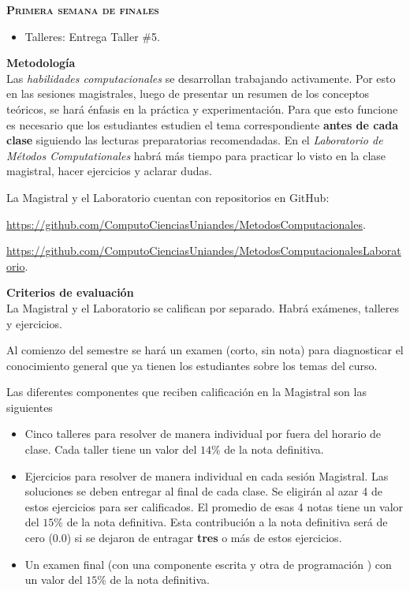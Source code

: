 \documentclass[letterpaper,10pt,onecolumn]{article}
\begin{document}
\noindent\textbf{\textsc{Primera semana de finales}}\\[-0.5cm]
\begin{itemize}
\item Talleres: Entrega Taller \#5. \\[-0.6cm]
\end{itemize}

\noindent\textbf{\large {} \quad
  Metodolog\'ia}\\[-0.2cm] 


\noindent\normalsize 
Las \emph{habilidades computacionales} se desarrollan trabajando activamente. 
Por esto en las sesiones magistrales, luego de presentar un resumen de
los conceptos te\'oricos, se har\'a \'enfasis en la pr\'actica y
experimentaci\'on.   
Para que esto funcione es necesario que los estudiantes estudien el
tema correspondiente {\bf antes de cada clase} siguiendo las lecturas
preparatorias recomendadas. En el \emph{Laboratorio de M\'etodos
  Computationales} habr\'a m\'as tiempo para practicar lo visto en la
clase magistral, hacer ejercicios y aclarar dudas.   

La Magistral y el Laboratorio cuentan con repositorios  en GitHub:

\url{https://github.com/ComputoCienciasUniandes/MetodosComputacionales}. 

\url{https://github.com/ComputoCienciasUniandes/MetodosComputacionalesLaboratorio}. 


\noindent\textbf{\large {} \quad Criterios de
  evaluaci\'on}\\[-0.2cm] 

La Magistral y el Laboratorio se califican por separado. 
Habr\'a ex\'amenes, talleres y ejercicios.

Al comienzo del semestre se har\'a un examen (corto, sin nota) para
diagnosticar el conocimiento general que ya tienen los estudiantes
sobre los temas del curso. 

Las diferentes componentes que reciben calificaci\'on en la Magistral son las
siguientes  

\begin{itemize}
\item 
Cinco talleres para resolver de manera individual por fuera del
horario de clase. 
Cada taller tiene un valor del $14\%$ de la nota definitiva.  
\item 
Ejercicios para resolver de manera individual en cada sesi\'on Magistral. 
Las soluciones se deben entregar al final de cada clase.
Se eligir\'an al azar 4 de estos ejercicios para ser calificados. 
El promedio de esas 4 notas tiene un valor del $15\%$ de la nota
definitiva. 
Esta contribuci\'on a la nota definitiva ser\'a de cero (0.0) si se
dejaron de entragar {\bf tres} o m\'as de estos ejercicios. 
\item
Un examen final (con una componente escrita y otra de
programaci\'on ) con un valor del $15\%$ de la nota definitiva.  
\end{itemize}
\end{document}
